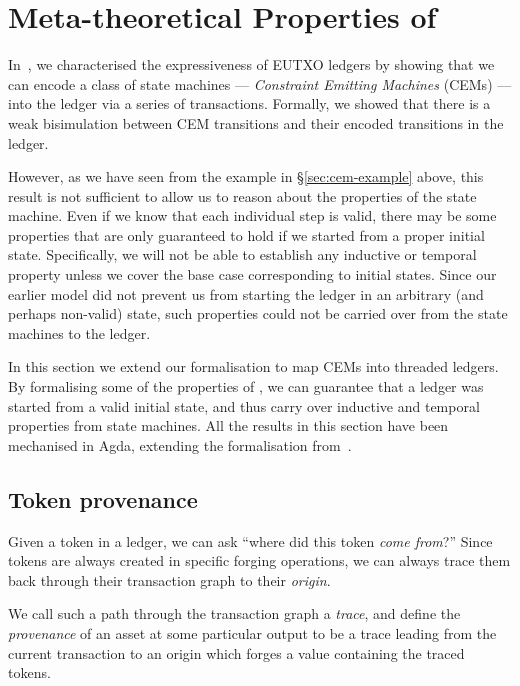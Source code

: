 \section{Meta-theoretical Properties of \EUTXOma}
\label{sec:formalization}

In~\cite{eutxo-1-paper}, we characterised the expressiveness of EUTXO
ledgers by showing that we can encode a class of state machines ---
\textit{Constraint Emitting Machines} (CEMs) --- into the ledger via a series
of transactions.  Formally, we showed that there is a weak
bisimulation between CEM transitions and their encoded
transitions in the ledger.

However, as we have seen from the example in \S\ref{sec:cem-example} above,
this result is not sufficient to allow us to reason about the properties
of the state machine.  Even if we know that each individual step is valid,
there may be some properties that are only guaranteed to hold if we started
from a proper initial state.
Specifically, we will not be able to establish any inductive or temporal property
unless we cover the base case corresponding to initial states.
Since our earlier model did not prevent
us from starting the ledger in an arbitrary (and perhaps non-valid) state, such
properties could not be carried over from the state machines to the
ledger.

In this section we extend our formalisation to map CEMs into threaded
ledgers.  By formalising some of the properties of \EUTXOma, we can
guarantee that a ledger was started from a valid initial state, and
thus carry over inductive and temporal properties from state machines.  All
the results in this section have been mechanised in Agda,
extending the formalisation from~\cite{eutxo-1-paper}.

\subsection{Token provenance}

Given a token in a \EUTXOma{} ledger, we can ask ``where did this token
\emph{come from}?''  Since tokens are always created in specific
forging operations, we can always trace them back through their
transaction graph to their \textit{origin}.

We call such a path through the transaction graph a \emph{trace}, and
define the \emph{provenance} of an asset at some particular output
to be a trace leading from the current transaction to an origin which
forges a value containing the traced tokens.

